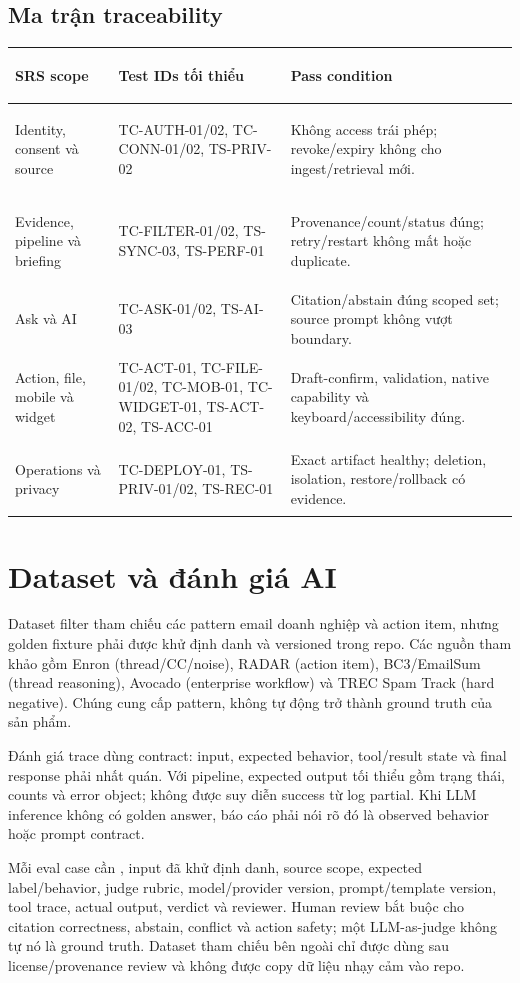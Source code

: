 \documentclass[12pt,a4paper]{article}
\begin{document}
\subsection{Ma trận traceability}
\begin{tabularx}{\textwidth}{>{\bfseries\raggedright\arraybackslash}p{3.2cm}P{4.6cm}Y}
\toprule SRS scope & Test IDs tối thiểu & Pass condition \\ \midrule
Identity, consent và source & TC-AUTH-01/02, TC-CONN-01/02, TS-PRIV-02 & Không access trái phép; revoke/expiry không cho ingest/retrieval mới. \\
Evidence, pipeline và briefing & TC-FILTER-01/02, TS-SYNC-03, TS-PERF-01 & Provenance/count/status đúng; retry/restart không mất hoặc duplicate. \\
Ask và AI & TC-ASK-01/02, TS-AI-03 & Citation/abstain đúng scoped set; source prompt không vượt boundary. \\
Action, file, mobile và widget & TC-ACT-01, TC-FILE-01/02, TC-MOB-01, TC-WIDGET-01, TS-ACT-02, TS-ACC-01 & Draft-confirm, validation, native capability và keyboard/accessibility đúng. \\
Operations và privacy & TC-DEPLOY-01, TS-PRIV-01/02, TS-REC-01 & Exact artifact healthy; deletion, isolation, restore/rollback có evidence. \\
\bottomrule
\end{tabularx}
\normalsize

\section{Dataset và đánh giá AI}
Dataset filter tham chiếu các pattern email doanh nghiệp và action item, nhưng golden fixture phải được khử định danh và versioned trong repo. Các nguồn tham khảo gồm Enron (thread/CC/noise), RADAR (action item), BC3/EmailSum (thread reasoning), Avocado (enterprise workflow) và TREC Spam Track (hard negative). Chúng cung cấp pattern, không tự động trở thành ground truth của sản phẩm.

Đánh giá trace dùng contract: input, expected behavior, tool/result state và final response phải nhất quán. Với pipeline, expected output tối thiểu gồm trạng thái, counts và error object; không được suy diễn success từ log partial. Khi LLM inference không có golden answer, báo cáo phải nói rõ đó là observed behavior hoặc prompt contract.

Mỗi eval case cần , input đã khử định danh, source scope, expected label/behavior, judge rubric, model/provider version, prompt/template version, tool trace, actual output, verdict và reviewer. Human review bắt buộc cho citation correctness, abstain, conflict và action safety; một LLM-as-judge không tự nó là ground truth. Dataset tham chiếu bên ngoài chỉ được dùng sau license/provenance review và không được copy dữ liệu nhạy cảm vào repo.
\end{document}
